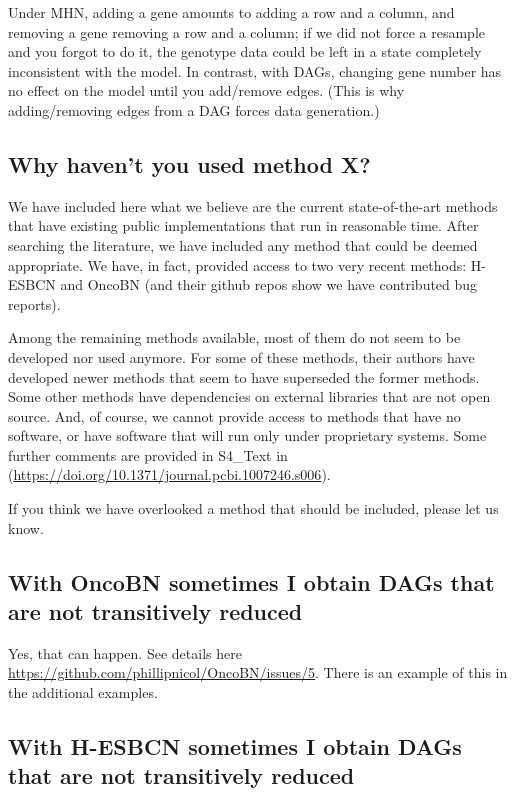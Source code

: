 \documentclass[a4paper,11pt]{article}
\begin{document}
 Under MHN, adding a gene amounts to adding a row and a column, and removing a gene removing a row and a column; if we did not force a resample and you forgot to do it, the genotype data could be left in a state completely inconsistent with the model. In contrast, with DAGs, changing gene number has no effect on the model until you add/remove edges.  (This is why adding/removing edges from a DAG forces data generation.)



 
 \subsection{Why haven't you used method X?}\label{other_methods}
 

We have included here what we believe are the current state-of-the-art methods that have existing public implementations that run in reasonable time. After searching the literature, we have included any method that could be deemed appropriate. We have, in fact, provided access to two very recent methods: H-ESBCN and OncoBN (and their github repos show we have contributed bug reports).

Among the remaining methods available, most of them do not seem to be developed nor used anymore. For some of these methods, their authors have developed newer methods that seem to have superseded the former methods. Some other methods  have dependencies on external libraries that are not open source.  And, of course, we cannot provide access to methods that have no software, or have software that will run only under proprietary systems. Some further comments are provided in S4\_Text in \cite{diaz2019every} (\url{https://doi.org/10.1371/journal.pcbi.1007246.s006}).

If you think we have overlooked a method that should be included, please let us know.




\subsection{With OncoBN sometimes I obtain DAGs that are not transitively reduced}

Yes, that can happen. See details here \url{https://github.com/phillipnicol/OncoBN/issues/5}. There is an example of this in the additional examples.

\subsection{With H-ESBCN sometimes I obtain DAGs that are not transitively reduced}
\end{document}

